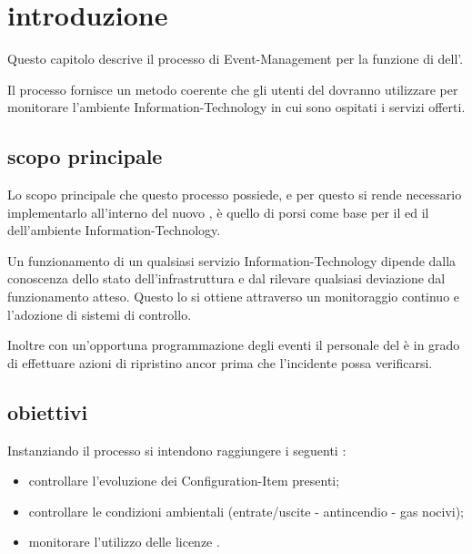 %
%
\section[Introduzione]{introduzione}
\label{em-introduction}
Questo capitolo descrive il processo di \acf{Event-Management} per la funzione di  dell'\entity{}.

Il processo fornisce un metodo coerente che gli utenti del  dovranno utilizzare per monitorare l'ambiente \acs{Information-Technology} in cui sono ospitati i servizi offerti.

\subsection[Scopo principale]{scopo principale}
\label{em-introduction-scope}
Lo scopo principale che questo processo possiede, e per questo si rende necessario implementarlo all'interno del nuovo , è quello di porsi come base per il  ed il  dell'ambiente \acs{Information-Technology}.

Un funzionamento  di un qualsiasi servizio \acs{Information-Technology} dipende dalla conoscenza dello stato dell'infrastruttura e dal rilevare qualsiasi deviazione dal funzionamento atteso. Questo lo si ottiene attraverso un monitoraggio continuo e l'adozione di sistemi di controllo.

Inoltre con un'opportuna programmazione degli eventi il personale del  è in grado di effettuare azioni di ripristino ancor prima che l'incidente possa verificarsi.

\subsection[Obiettivi]{obiettivi}
\label{em-introduction-objectives}
Instanziando il processo si intendono raggiungere i seguenti :

\begin{itemize}
\item{controllare l'evoluzione dei \ac{Configuration-Item} presenti;}
\item{controllare le condizioni ambientali (entrate/uscite - antincendio - gas nocivi);}
\item{monitorare l'utilizzo delle licenze .}
\end{itemize}

